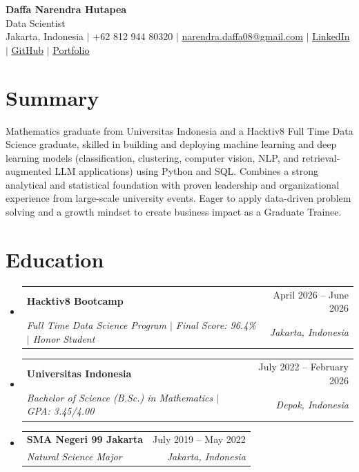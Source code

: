 \documentclass[letterpaper,10pt]{article}
\makeatletter
\newcommand{\resumeSubheading}[4]{
\vspace{-1pt}\item
  \begin{tabular*}{0.97\textwidth}[t]{l@{\extracolsep{\fill}}r}
    \textbf{#1} & #2 \\
    \textit{#3} & \textit{#4} \\
  \end{tabular*}\vspace{-7pt}
}
\newcommand{\resumeSubHeadingList}{\begin{itemize}[leftmargin=0.15in, label={}]}
\newcommand{\resumeSubHeadingListEnd}{\end{itemize}}
\makeatother
\begin{document}
\begin{center}
  \textbf{\Huge Daffa Narendra Hutapea} \\ \vspace{3pt}
  {\large Data Scientist} \\ \vspace{3pt}
  \small Jakarta, Indonesia $|$ +62 812 944 80320 $|$
  \href{mailto:narendra.daffa08@gmail.com}{narendra.daffa08@gmail.com} $|$
  \href{https://linkedin.com/in/daffa-hutapea}{\underline{LinkedIn}} $|$
  \href{https://github.com/daphutapea}{\underline{GitHub}} $|$
  \href{https://daphutapea.github.io}{\underline{Portfolio}}
\end{center}

\section*{Summary}
Mathematics graduate from Universitas Indonesia and a Hacktiv8 Full Time Data Science graduate, skilled in building and deploying machine learning and deep learning models (classification, clustering, computer vision, NLP, and retrieval-augmented LLM applications) using Python and SQL. Combines a strong analytical and statistical foundation with proven leadership and organizational experience from large-scale university events. Eager to apply data-driven problem solving and a growth mindset to create business impact as a Graduate Trainee.

\section{Education}
\resumeSubHeadingList
  \resumeSubheading
      {Hacktiv8 Bootcamp}{April 2026 -- June 2026}
      {Full Time Data Science Program $|$ Final Score: 96.4\% $|$ Honor Student}{Jakarta, Indonesia}
  \resumeSubheading
      {Universitas Indonesia}{July 2022 -- February 2026}
      {Bachelor of Science (B.Sc.) in Mathematics $|$ GPA: 3.45/4.00}{Depok, Indonesia}
  \resumeSubheading
      {SMA Negeri 99 Jakarta}{July 2019 -- May 2022}
      {Natural Science Major}{Jakarta, Indonesia}
\resumeSubHeadingListEnd

\end{document}
